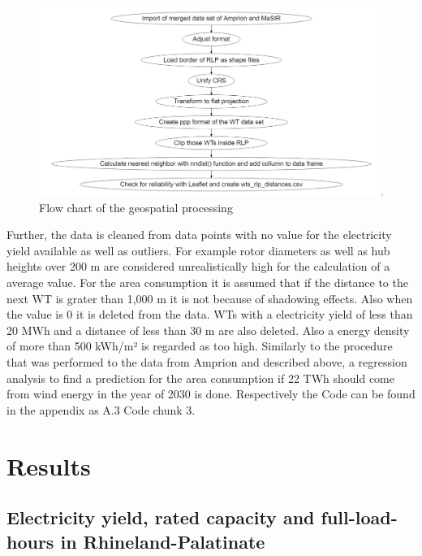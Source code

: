 \documentclass[a4paper,11pt]{article}
\begin{document}
\begin{figure}[H]

{\centering \includegraphics[width=1\linewidth]{figures/flowchart_nearest} 

}

\caption{Flow chart of the geospatial processing}\label{fig:nearest}
\end{figure}
Further, the data is cleaned from data points with no value for the electricity yield available as well as outliers. For example rotor diameters as well as hub heights over 200 m are considered unrealistically high for the calculation of a average value. For the area consumption it is assumed that if the distance to the next WT is grater than 1,000 m it is not because of shadowing effects. Also when the value is 0 it is deleted from the data. WTs with a electricity yield of less than 20 MWh and a distance of less than 30 m are also deleted. Also a energy density of more than 500 kWh/m² is regarded as too high. Similarly to the procedure that was performed to the data from Amprion and described above, a regression analysis to find a prediction for the area consumption if 22 TWh should come from wind energy in the year of 2030 is done. Respectively the Code can be found in the appendix as A.3 Code chunk 3.

\newpage

\hypertarget{results}{%
\section{Results}\label{results}}

\hypertarget{electricity-yield-rated-capacity-and-full-load-hours-in-rhineland-palatinate}{%
\subsection{Electricity yield, rated capacity and full-load-hours in Rhineland-Palatinate}\label{electricity-yield-rated-capacity-and-full-load-hours-in-rhineland-palatinate}}
\end{document}
